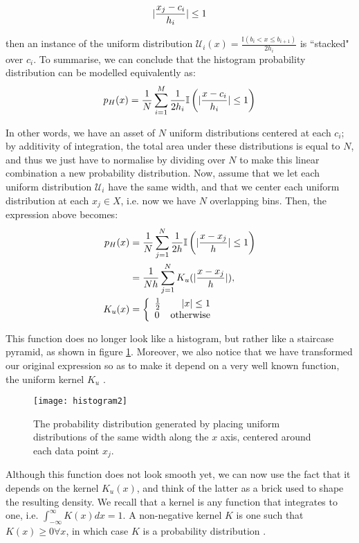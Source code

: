 \documentclass[../main.tex]{subfiles}
\begin{document}
\begin{align*}
\lvert\frac{x_j - c_i}{h_i}\rvert \leq 1
\end{align*}
\par then an instance of the uniform distribution $\mathcal{U}_i(x) = \frac{\mathbb{I}(b_i < x \leq b_{i+1})}{2h_i}$ is ``stacked" over $c_i$. To summarise, we can conclude that the histogram probability distribution can be modelled equivalently as:
\begin{align*}
p_H(x) = \frac{1}{N}\sum_{i=1}^M\frac{1}{2h_i}\mathbb{I}\left(\lvert\frac{x - c_i}{h_i}\rvert \leq 1\right)
\end{align*}
\par In other words, we have an asset of $N$ uniform distributions centered at each $c_i$; by additivity of integration, the total area under these distributions is equal to $N$, and thus we just have to normalise by dividing over $N$ to make this linear combination a new probability distribution. Now, assume that we let each uniform distribution $\mathcal{U}_i$ have the same width, and that we center each uniform distribution at each $x_j \in X$, i.e. now we have $N$ overlapping bins. Then, the expression above becomes:
\begin{align*}
p_{H}(x) &= \frac{1}{N}\sum_{j=1}^N\frac{1}{2h}\mathbb{I}\left(\lvert\frac{x - x_j}{h}\rvert \leq 1\right)\\
&= \frac{1}{Nh}\sum_{j=1}^NK_u(\lvert\frac{x - x_j}{h}\rvert),\\
K_u(x) &= \left\{
     \begin{array}{lr}
      \frac{1}{2} & \lvert x\rvert \leq 1 \\
      0 & \text{otherwise} 
     \end{array}
   \right.
\end{align*}
\par This function does no longer look like a histogram, but rather like a staircase pyramid, as shown in figure \ref{fig_hist2}. Moreover, we also notice that we have transformed our original expression so as to make it depend on a very well known function, the uniform kernel $K_u$ \cite{Hansen2009}. 
\begin{figure}[t]
\centering
\texttt{[image: histogram2]}
\caption{The probability distribution generated by placing uniform distributions of the same width along the $x$ axis, centered around each data point $x_j$.}
\label{fig_hist2}
\end{figure}
\par Although this function does not look smooth yet, we can now use the fact that it depends on the kernel $K_u(x)$, and think of the latter as a brick used to shape the resulting density. We recall that a kernel is any function that integrates to one, i.e. $\int_{-\infty}^\infty K(x)dx = 1$. A non-negative kernel $K$ is one such that $K(x) \geq 0 \forall x$, in which case $K$ is a probability distribution \cite{Hansen2009}.
\end{document}
